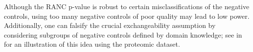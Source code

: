 \documentclass[a4paper,11pt]{article}
\theoremstyle{plain}
\theoremstyle{definition}
\def\calI{\mathcal{I}}
\def\1{\mathbbm{1}}
\theoremstyle{plain}
\newcommand{\No}{{n}}
\newcommand{\NoNc}{m}
\newcommand{\testStatistics}[1]{{T_{#1}}}
\newcommand{\nickname}{{\text{RANC}}}
\newcommand{\hypothesisIndex}[1]{{\calI_{#1}}}
\begin{document}
Although the RANC p-value is robust to certain
misclassifications of the negative controls, using too many negative
controls of poor quality may lead to low power. Additionally, one can falsify
the crucial exchangeability assumption by considering subgroups of
negative controls defined by domain knowledge; see
 in  for an illustration of
this idea using the proteomic dataset.

\end{document}
